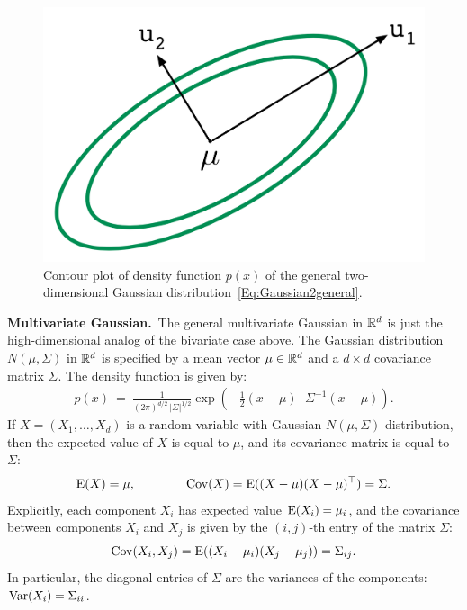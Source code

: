\documentclass[11pt]{article}
\def\Ex#1{{\rm E}(#1)}
\def\Var#1{{\rm Var}(#1)}
\begin{document}
\begin{figure}[h!]
\centering
\includegraphics[scale=0.22]{generalGaussian2}
\caption{Contour plot of density function $p(x)$ of the general two-dimensional Gaussian distribution~\eqref{Eq:Gaussian2general}.}
\label{fig:gaussian2general}
\end{figure}

\smallskip
{\bf Multivariate Gaussian.}~The general multivariate Gaussian in $\mathbb{R}^d$ is just the high-dimensional analog of the bivariate case above. The Gaussian distribution $N(\mu,\Sigma)$ in $\mathbb{R}^d$ is specified by a mean vector $\mu \in \mathbb{R}^d$ and a $d \times d$ covariance matrix $\Sigma$. The density function is given by:
\begin{align}\label{Eq:GaussianMulti}
p(x) ~=~ \frac{1}{(2\pi)^{d/2} \, |\Sigma|^{1/2}} \exp \left(- \frac{1}{2} (x - \mu)^\top \Sigma^{-1} (x-\mu) \right).
\end{align}
If $X = (X_1,\dots,X_d)$ is a random variable with Gaussian $N(\mu,\Sigma)$ distribution, then the expected value of $X$ is equal to $\mu$, and its covariance matrix is equal to $\Sigma$:
\begin{align}\label{Eq:GaussianMultiEx}
\Ex{X} = \mu,~~~~~~~~~~~~{\rm Cov}(X) = \Ex{(X-\mu)(X-\mu)^\top} = \Sigma.
\end{align}
Explicitly, each component $X_i$ has expected value $\Ex{X_i} = \mu_i$, and the covariance between components $X_i$ and $X_j$ is given by the $(i,j)$-th entry of the matrix $\Sigma$:
$${\rm Cov}(X_i,X_j) = \Ex{(X_i-\mu_i)(X_j-\mu_j)} = \Sigma_{ij}.$$
In particular, the diagonal entries of $\Sigma$ are the variances of the components: $\Var{X_i} = \Sigma_{ii}$.
\end{document}
